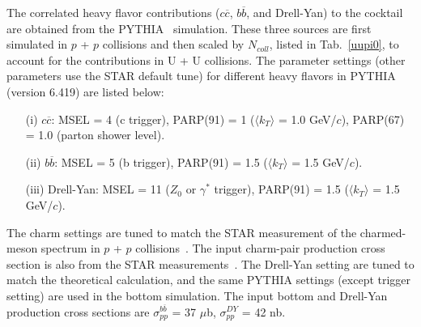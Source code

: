 The correlated heavy flavor contributions ($c\overline{c}$, $b\overline{b}$, and Drell-Yan) to the cocktail are obtained from the PYTHIA~\cite{Pythia} simulation. These three sources are first simulated in $p$ + $p$ collisions and then scaled by $N_{coll}$, listed in Tab.~\ref{uupi0}, to account for the contributions in U + U collisions. The parameter settings (other parameters use the STAR default tune) for different heavy flavors in PYTHIA (version 6.419) are listed below:
\begin{itemize}
\item[(i)] $c\overline{c}$: MSEL = 4 (c trigger), PARP(91) = 1 ($\langle k_{T} \rangle$ = 1.0 GeV/$c$), PARP(67) = 1.0 (parton shower level). 
\item[(ii)] $b\overline{b}$: MSEL = 5 (b trigger), PARP(91) = 1.5 ($\langle k_{T} \rangle$ = 1.5 GeV/$c$).
\item[(iii)] Drell-Yan: MSEL = 11 ($Z_{0}$ or $\gamma^{*}$  trigger), PARP(91) = 1.5 ($\langle k_{T} \rangle$ = 1.5 GeV/$c$).
\end{itemize}
The charm settings are tuned to match the STAR measurement of the charmed-meson spectrum in $p$ + $p$ collisions~\cite{charmedMesonpp}. The input charm-pair production cross section is also from the STAR measurements~\cite{charmedMesonpp, charmedMesonAuAu}. The Drell-Yan setting are tuned to match the theoretical calculation, and the same PYTHIA settings (except trigger setting) are used in the bottom simulation. The input bottom and Drell-Yan production cross sections are $\sigma_{pp}^{b\overline{b}}$ = 37 $\mu$b, $\sigma_{pp}^{DY}$ = 42 nb.

